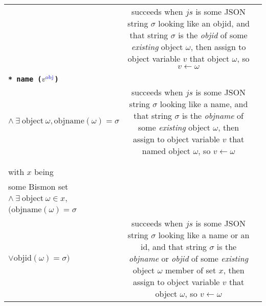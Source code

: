 \begin{table}
\begin{relsize}{-1.3}
\begin{center}
\begin{tabular}{lcp{6.3cm}}
\begin{minipage}[t]{4cm}
      \end{minipage}
      &
      succeeds when $\mathit{js}$ is some JSON string $\sigma$ looking like an objid, and that string $\sigma$ is the \emph{objid} of some \emph{existing} object $\omega$, then assign to
      object variable $v$ that object $\omega$, so  $v \leftarrow \omega$ \\
            \rule{0pt}{1ex} \\
      \texttt{\textbf{* name ($v^{\mathrm{\textcolor{blue}{obj}}}$)}} &
      \begin{minipage}[t]{4.5cm}
        $\mathit{js} \equiv \mathrm{some ~ JSON ~ string}~ \sigma$\\
        \hspace*{0.5em} $ \wedge ~ \exists ~ \mathrm{object} ~ \omega, \mathrm{objname}(\omega) = \sigma$ 
      \end{minipage}
      &
      succeeds when $\mathit{js}$ is some JSON string $\sigma$ looking like a name, and that string $\sigma$ is the \emph{objname} of some \emph{existing} object $\omega$, then assign to
      object variable $v$ that named object $\omega$, so  $v \leftarrow \omega$ \\
      \rule{0pt}{3ex} \\
      \begin{minipage}[t]{3.5cm}
        \texttt{\textbf{* member ($x^{\mathrm{\textcolor{blue}{val}}} ~ v^{\mathrm{\textcolor{blue}{obj}}}$)}} \\
        with $x$ being \\
        some Bismon set
      \end{minipage}
        &
      \begin{minipage}[t]{4.5cm}
        $\mathit{js} \equiv \mathrm{some ~ JSON ~ string}~ \sigma$\\
        \hspace*{0.5em} $ \wedge ~ \exists ~ \mathrm{object} ~ \omega \in x, $  \\
        \hspace*{1.8em} $ ( \mathrm{objname}(\omega) = \sigma $ \\
        \hspace*{2em} $  \vee  \mathrm{objid}(\omega) = \sigma )$ 
      \end{minipage}
      &
      succeeds when $\mathit{js}$ is some JSON string $\sigma$ looking like a name or an id, and that string $\sigma$ is the \emph{objname} or \emph{objid} of some \emph{existing} object $\omega$ member of  set $x$, then assign to
      object variable $v$ that object $\omega$, so  $v \leftarrow \omega$ \\

\end{tabular}
\end{center}
\end{relsize}
\end{table}
